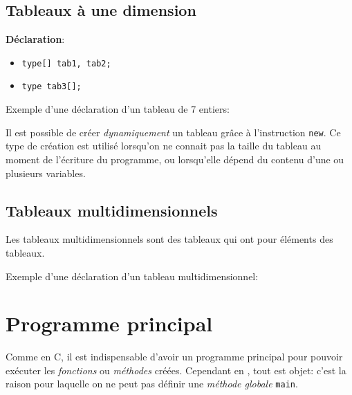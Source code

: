 				
			\subsection{Tableaux à une dimension}
			
				\textbf{Déclaration}:
				\begin{itemize}
					\item \lstinline|type[] tab1, tab2;|
					\item \lstinline|type tab3[];|
				\end{itemize}
			
				\begin{exemple}
					Exemple d'une déclaration d'un tableau de 7 entiers:
					
				\end{exemple}
			
				Il est possible de créer \emph{dynamiquement} un tableau grâce à l'instruction \lstinline|new|. Ce type de création est utilisé lorsqu'on ne connait pas la taille du tableau au moment de l'écriture du programme, ou lorsqu'elle dépend du contenu d'une ou plusieurs variables.
				
				
			
			\subsection{Tableaux multidimensionnels}
			
				Les tableaux multidimensionnels sont des tableaux qui ont pour éléments des tableaux.
				
				\begin{exemple}
					Exemple d'une déclaration d'un tableau multidimensionnel:
					
				\end{exemple}
			
		\section{Programme principal}
			
			Comme en C, il est indispensable d'avoir un programme principal pour pouvoir exécuter les \emph{fonctions} ou \emph{méthodes} créées.
			Cependant en \lang, tout est objet: c'est la raison pour laquelle on ne peut pas définir une \emph{méthode globale} \lstinline|main|.
		
